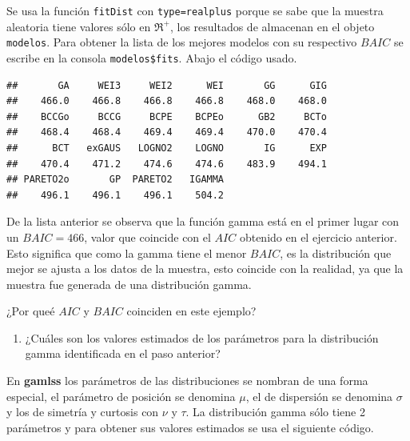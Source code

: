\documentclass[10pt,]{krantz}
\makeatletter
\newenvironment{Shaded}{\begin{snugshade}}{\end{snugshade}}
\newcommand{\KeywordTok}[1]{\textcolor[rgb]{0.13,0.29,0.53}{\textbf{#1}}}
\newcommand{\DataTypeTok}[1]{\textcolor[rgb]{0.13,0.29,0.53}{#1}}
\newcommand{\DecValTok}[1]{\textcolor[rgb]{0.00,0.00,0.81}{#1}}
\newcommand{\StringTok}[1]{\textcolor[rgb]{0.31,0.60,0.02}{#1}}
\newcommand{\OperatorTok}[1]{\textcolor[rgb]{0.81,0.36,0.00}{\textbf{#1}}}
\newcommand{\NormalTok}[1]{#1}
\providecommand{\tightlist}{%
  \setlength{\itemsep}{0pt}\setlength{\parskip}{0pt}}
\newenvironment{kframe}{%
\medskip{}
\setlength{\fboxsep}{.8em}
 \def\at@end@of@kframe{}%
 \ifinner\ifhmode%
  \def\at@end@of@kframe{\end{minipage}}%
  \begin{minipage}{\columnwidth}%
 \fi\fi%
 \def\FrameCommand##1{\hskip\@totalleftmargin \hskip-\fboxsep
 \colorbox{shadecolor}{##1}\hskip-\fboxsep
     \hskip-\linewidth \hskip-\@totalleftmargin \hskip\columnwidth}%
 \MakeFramed {\advance\hsize-\width
   \@totalleftmargin\z@ \linewidth\hsize
   \@setminipage}}%
 {\par\unskip\endMakeFramed%
 \at@end@of@kframe}
\renewenvironment{Shaded}{\begin{kframe}}{\end{kframe}}
\makeatother
\begin{document}
Se usa la función \texttt{fitDist} con
\texttt{type=\textquotesingle{}realplus\textquotesingle{}} porque se
sabe que la muestra aleatoria tiene valores sólo en \(\Re^+\), los
resultados de almacenan en el objeto \texttt{modelos}. Para obtener la
lista de los mejores modelos con su respectivo \(BAIC\) se escribe en la
consola \texttt{modelos\$fits}. Abajo el código usado.

\begin{Shaded}
\end{Shaded}

\begin{verbatim}
##       GA     WEI3     WEI2      WEI       GG      GIG 
##    466.0    466.8    466.8    466.8    468.0    468.0 
##    BCCGo     BCCG     BCPE    BCPEo      GB2     BCTo 
##    468.4    468.4    469.4    469.4    470.0    470.4 
##      BCT   exGAUS   LOGNO2    LOGNO       IG      EXP 
##    470.4    471.2    474.6    474.6    483.9    494.1 
## PARETO2o       GP  PARETO2   IGAMMA 
##    496.1    496.1    496.1    504.2
\end{verbatim}

De la lista anterior se observa que la función gamma está en el primer
lugar con un \(BAIC=466\), valor que coincide con el \(AIC\) obtenido en
el ejercicio anterior. Esto significa que como la gamma tiene el menor
\(BAIC\), es la distribución que mejor se ajusta a los datos de la
muestra, esto coincide con la realidad, ya que la muestra fue generada
de una distribución gamma.

¿Por queé \(AIC\) y \(BAIC\) coinciden en este ejemplo?

\begin{enumerate}
\def\labelenumi{\arabic{enumi})}
\setcounter{enumi}{1}
\tightlist
\item
  ¿Cuáles son los valores estimados de los parámetros para la
  distribución gamma identificada en el paso anterior?
\end{enumerate}

En \textbf{gamlss} los parámetros de las distribuciones se nombran de
una forma especial, el parámetro de posición se denomina \(\mu\), el de
dispersión se denomina \(\sigma\) y los de simetría y curtosis con
\(\nu\) y \(\tau\). La distribución gamma sólo tiene 2 parámetros y para
obtener sus valores estimados se usa el siguiente código.
\end{document}
